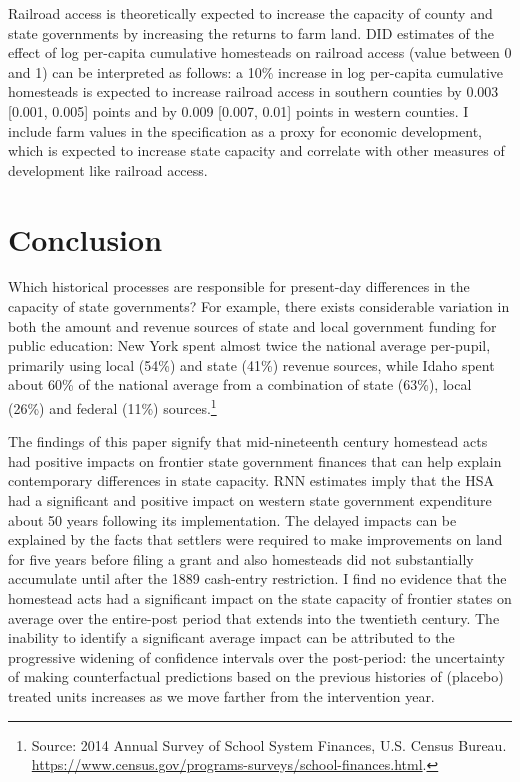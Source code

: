 \documentclass[12pt]{article}
\begin{document}
{Railroad access is theoretically expected to increase the capacity of county and state governments by increasing the returns to farm land. DID estimates of the effect of log per-capita cumulative homesteads on railroad access (value between 0 and 1) can be interpreted as follows: a 10\% increase in log per-capita cumulative homesteads is expected to increase railroad access in southern counties by 0.003 [0.001, 0.005] points and by 0.009 [0.007, 0.01] points in western counties. I include farm values in the specification as a proxy for economic development, which is expected to increase state capacity and correlate with other measures of development like railroad access. 

\section{Conclusion} \label{discussion} 

Which historical processes are responsible for present-day differences in the capacity of state governments? For example, there exists considerable variation in both the amount and revenue sources of state and local government funding for public education: New York spent almost twice the national average per-pupil, primarily using local (54\%) and state (41\%) revenue sources, while Idaho spent about 60\% of the national average from a combination of state (63\%), local (26\%) and federal (11\%) sources.\footnote{Source: 2014 Annual Survey of School System Finances, U.S. Census Bureau. \url{https://www.census.gov/programs-surveys/school-finances.html}.}

The findings of this paper signify that mid-nineteenth century homestead acts had positive impacts on frontier state government finances that can help explain contemporary differences in state capacity. RNN estimates imply that the HSA had a significant and positive impact on western state government expenditure about 50 years following its implementation. The delayed impacts can be explained by the facts that settlers were required to make improvements on land for five years before filing a grant and also homesteads did not substantially accumulate until after the 1889 cash-entry restriction. I find no evidence that the homestead acts had a significant impact on the state capacity of frontier states on average over the entire-post period that extends into the twentieth century. The inability to identify a significant average impact can be attributed to the progressive widening of confidence intervals over the post-period: the uncertainty of making counterfactual predictions based on the previous histories of (placebo) treated units increases as we move farther from the intervention year. 

}
\end{document}
